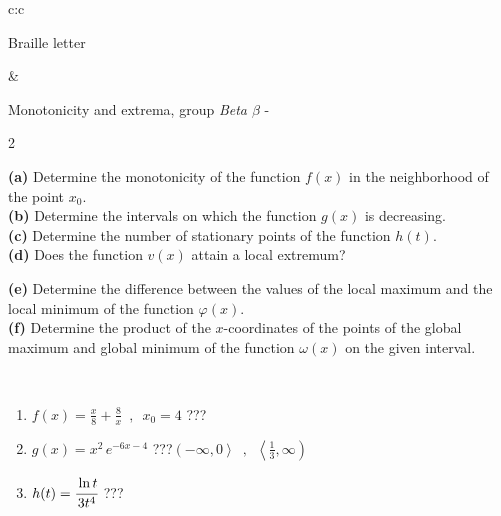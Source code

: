 \documentclass[10pt]{report}
\begin{document}
\begin{tabular}{c:c}
\begin{minipage}[c][104.5mm][t]{0.5\linewidth}
\begin{center}
\begin{minipage}{0.20\linewidth}
\begin{center}
{\small Braille letter}
\end{center}
\end{minipage}
\end{center}
\end{minipage}
&
\begin{minipage}[c][104.5mm][t]{0.5\linewidth}
\begin{center}
\vspace{5mm}
{\huge Monotonicity and extrema, group \textit{Beta $\beta$} -}\\[5mm]
\begin{minipage}{0.95\linewidth}
\begin{center}
{\small \begin{multicols}{2} \raggedright
\textbf{(a)} Determine the monotonicity of the function \(f(x)\) in the neighborhood of the point \(x_0\). \\[1mm]
\textbf{(b)} Determine the intervals on which the function \(g(x)\) is decreasing. \\[1mm]
\textbf{(c)} Determine the number of stationary points of the function \(h(t)\). \\[1mm]
\textbf{(d)} Does the function \(v(x)\) attain a local extremum? \par \columnbreak
\textbf{(e)} Determine the difference between the values of the local maximum and the local minimum of the function \(\varphi(x)\). \\[1mm]
\textbf{(f)} Determine the product of the \(x\)-coordinates of the points of the global maximum and global minimum of the function \(\omega(x)\) on the given interval. \\[1mm]
\end{multicols}
}
\end{center}
\end{minipage}
\\[1mm]
\begin{minipage}{0.79\linewidth}
\begin{center}
\begin{varwidth}{\linewidth}
\setlength{\itemsep}{0pt}
\begin{enumerate}
\normalsize
\item $f(x)=\frac{x}{8}+\frac{8}{x} \enspace , \enspace x_0=4$\quad \dotfill\; ???\;\dotfill \quad {}
\item $g(x)=x^2\, e^{-6x-4}$\quad \dotfill\; ???\;\dotfill \quad $\left(-\infty , 0\right\rangle\enspace , \enspace \left\langle\frac{1}{3} , \infty\right)$
\item $h(t)=\cfrac{\ln t}{3t^4}$\quad \dotfill\; ???\;\dotfill {}

\end{enumerate}
\end{varwidth}
\end{center}
\end{minipage}
\end{center}
\end{minipage}
\end{tabular}
\end{document}
